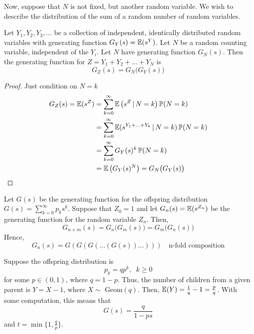 	Now, suppose that $N$ is not fixed, but another random variable. We wish to describe the distribution of the sum of a random number of random variables. 

	\begin{lemma}
		\label{thm:generating-function-of-a-randomly-stopped-sum}
		Let $Y_1, Y_2, Y_3, ...$ be a collection of independent, identically distributed random variables with generating function $G_Y (s) = \operatorname{\mathbb{E}}(s^Y)$. Let $N$ be a random counting variable, independent of the $Y_i$. Let $N$ have generating function $G_N (s)$. Then the generating function for $Z = Y_1 + Y_2 + ... + Y_N$ is 
		\begin{equation}
			G_Z (s) = G_N \big( G_Y (s) \big)
		\end{equation}
	\end{lemma}
	\begin{proof}
		Just condition on $N = k$ 
		\begin{align*}
			G_Z (s) = \operatorname{\mathbb{E}}(s^Z) & = \sum_{k=0}^\infty \operatorname{\mathbb{E}}\big( s^Z \,|\, N=k\big) \, \mathbb{P}(N=k) \\
			& = \sum_{k=0}^\infty \operatorname{\mathbb{E}}(s^{Y_1 + ... + Y_k} \,|\,N=k) \, \mathbb{P}(N=k) \\
			& = \sum_{k=0}^\infty G_Y (s)^k \, \mathbb{P}(N=k) \\
			& = \operatorname{\mathbb{E}}\big( G_Y (s)^N \big) = G_N \big( G_Y (s) \big)
		\end{align*}
	\end{proof}

	\begin{theorem}
		\label{thm:extinction-probability-from-the-offspring}
		Let $G(s)$ be the generating function for the offspring distribution $G(s) = \sum_{k=0}^\infty p_k s^k$. Suppose that $Z_0 = 1$ and let $G_n (s) = \operatorname{\mathbb{E}}(s^{Z_n})$ be the generating function for the random variable $Z_n$. Then, 
		\begin{equation}
			G_{n+m} (s) = G_n \big(G_m (s)\big) = G_m \big( G_n (s) \big)
		\end{equation}
		Hence, 
		\begin{equation}
			G_n (s) = G(G(G(...(G(s))...))) \quad \text{n-fold composition}
		\end{equation}
	\end{theorem}

	\begin{example}
		\label{ex:branching-process-with-geometric-offspring}
		Suppose the offspring distribution is
		\begin{equation}
			p_k = q p^k, \;\; k \geq 0
		\end{equation}
		for some $p \in (0, 1)$, where $q = 1-p$. Thus, the number of children from a given parent is $Y = X - 1$, where $X \sim$ Geom$(q)$. Then, $\operatorname{\mathbb{E}}(Y) = \frac{1}{q} - 1 = \frac{p}{q}$. With some computation, this means that
		\begin{equation}
			G(s) = \frac{q}{1- p s}
		\end{equation}
		and $t = \min \{1, \frac{q}{p}\}$. 
	\end{example}

